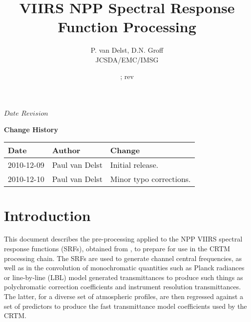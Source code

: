 


%

\SVN $Date$
\SVN $Revision$


\title{VIIRS NPP Spectral Response Function Processing}
\author{P. van Delst,
        D.N. Groff\\JCSDA/EMC/IMSG}
\date{\SVNDate ; rev\SVNRevision}



\maketitle


\thispagestyle{empty}
\vspace*{10cm}
\begin{center}
  {\sffamily\Large\bfseries Change History}
  \begin{table}[htp]
    \centering
    \begin{tabular}{|p{2cm}|p{3cm}|p{8cm}|}
      \hline
      \sffamily\textbf{Date} & \sffamily\textbf{Author} & \sffamily\textbf{Change}\\
      \hline\hline
      2010-12-09 & Paul van Delst & Initial release.\\
      \hline
      2010-12-10 & Paul van Delst & Minor typo corrections.\\
      \hline
    \end{tabular}
  \end{table}
\end{center}
\clearpage
\pagestyle{fancy}
\fancyhead[LE,RO]{\sffamily \rightmark}
\fancyhead[LO,RE]{\sffamily \leftmark}
\setcounter{page}{1}



\section{Introduction}
This document describes the pre-processing applied to the NPP VIIRS spectral response functions (SRFs), obtained from \cite{VIIRS_SRF_Data}, to prepare for use in the CRTM processing chain. The SRFs are used to generate channel central frequencies, as well as in the convolution of monochromatic quantities such as Planck radiances or line-by-line (LBL) model generated transmittances to produce such things as polychromatic correction coefficients and instrument resolution transmittances. The latter, for a diverse set of atmospheric profiles, are then regressed against a set of predictors to produce the fast transmittance model coefficients used by the CRTM.

